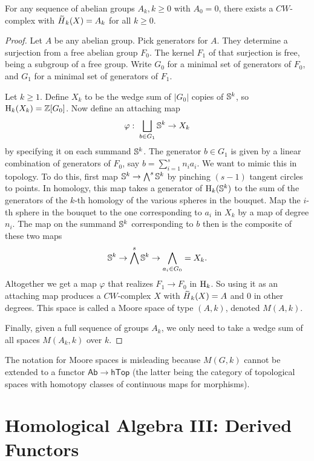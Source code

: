 \begin{prop}
    For any sequence of abelian groups $A_k,k\geq 0$ with $A_0=0$, there exists a $CW$-complex with $\wt{H}_k(X)=A_k$ for all $k\geq 0$.
\end{prop}
\begin{proof}
    Let $A$ be any abelian group. Pick generators for $A$. They determine a surjection from a free abelian group $F_0$. The kernel $F_1$ of that surjection is free, being a subgroup of a free group. Write $G_0$ for a minimal set of generators of $F_0$, and $G_1$ for a minimal set of generators of $F_1$.

    Let $k\geq 1$. Define $X_k$ to be the wedge sum of $|G_0|$ copies of $\mathbb{S}^k$, so $\mathrm{H}_k(X_k)=\mathbb{Z}[G_0]$. Now define an attaching map
    \[\varphi:\;\bigsqcup_{b\in G_1}\mathbb{S}^k\to X_k\]
    by specifying it on each summand $\mathbb{S}^k$. The generator $b\in G_1$ is given by a linear combination of generators of $F_0$, say $b=\sum_{i=1}^s n_i a_i$. We want to mimic this in topology. To do this, first map $\mathbb{S}^k\to \bigwedge^s \mathbb{S}^k$ by pinching $(s-1)$ tangent circles to points. In homology, this map takes a generator of $\mathrm{H}_k(\mathbb{S}^k)$ to the sum of the generators of the $k$-th homology of the various spheres in the bouquet. Map the $i$-th sphere in the bouquet to the one corresponding to $a_i$ in $X_k$ by a map of degree $n_i$. The map on the summand $\mathbb{S}^k$ corresponding to $b$ then is the composite of these two maps
    \[\mathbb{S}^k\to \bigwedge^s \mathbb{S}^k\to \bigwedge_{a_i\in G_0}=X_k.\]
    Altogether we get a map $\varphi$ that realizes $F_1\to F_0$ in $\mathrm{H}_k$. So using it as an attaching map produces a $CW$-complex $X$ with $\wt{H}_k(X)=A$ and $0$ in other degrees. This space is called a Moore space of type $(A,k)$, denoted $M(A,k)$.

    Finally, given a full sequence of groups $A_k$, we only need to take a wedge sum of all spaces $M(A_k,k)$ over $k$.
\end{proof}

\begin{rem}
    The notation for Moore spaces is misleading because $M(G,k)$ cannot be extended to a functor $\mathsf{Ab}\to \mathsf{hTop}$ (the latter being the category of topological spaces with homotopy classes of continuous maps for morphisms).
\end{rem}




\clearpage
\section{Homological Algebra III: Derived Functors}


